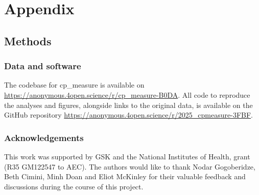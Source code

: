 \documentclass{article}
\begin{document}
\section{Appendix}
\label{sec:orgdd18dd8}
\subsection{Methods}
\label{sec:orgb3e9382}
\subsubsection{Data and software}
\label{sec:orgbda0ae2}
The codebase for cp\_measure is available on \url{https://anonymous.4open.science/r/cp\_measure-B0DA}. All code to reproduce the analyses and figures, alongside links to the original data, is available on the GitHub repository \url{https://anonymous.4open.science/r/2025_cpmeasure-3FBF}. 
% 
\subsubsection{Acknowledgements}
\label{sec:acknowledgements}

This work was supported by GSK and the National Institutes of Health, grant (R35 GM122547 to AEC). The authors would like to thank Nodar Gogoberidze, Beth Cimini, Minh Doan and Eliot McKinley for their valuable feedback and discussions during the course of this project.
\end{document}
